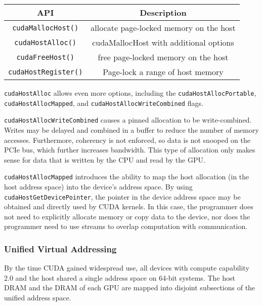 \begin{table}[h]
    \centering
    \caption[CUDA Pinned Memory-Management APIs]{}
    \label{tab:cuda-pinned-apis}
    \begin{tabular}{|c|c|}
    \hline
    \textbf{API}                & \textbf{Description} \\ \hline
    \texttt{cudaMallocHost()}   & allocate page-locked memory on the host\\ \hline
    \texttt{cudaHostAlloc()}    & cudaMallocHost with additional options \\ \hline
    \texttt{cudaFreeHost()}     & free page-locked memory on the host\\ \hline
    \texttt{cudaHostRegister()} & Page-lock a range of host memory \\ \hline
    \end{tabular}
\end{table}

\texttt{cudaHostAlloc} allows even more options, including the \texttt{cudaHostAllocPortable}, \texttt{cudaHostAllocMapped}, and \texttt{cudaHostAllocWriteCombined} flags.

\texttt{cudaHostAllocWriteCombined} causes a pinned allocation to be write-combined.
Writes may be delayed and combined in a buffer to reduce the number of memory accesses.
Furthermore, coherency is not enforced, so data is not snooped on the PCIe bus, which further increases bandwidth.
This type of allocation only makes sense for data that is written by the CPU and read by the GPU.


\texttt{cudaHostAllocMapped} introduces the ability to map the host allocation (in the host address space) into the device's address space.
By using \texttt{cudaHostGetDevicePointer}, the pointer in the device address space may be obtained and directly used by CUDA kernels.
In this case, the programmer does not need to explicitly allocate memory or copy data to the device, nor does the programmer need to use streams to overlap computation with communication.

\subsubsection{Unified Virtual Addressing}

By the time CUDA gained widespread use, all devices with compute capability 2.0 and the host shared a single address space on 64-bit systems.
The host DRAM and the DRAM of each GPU are mapped into disjoint subsections of the unified address space.

